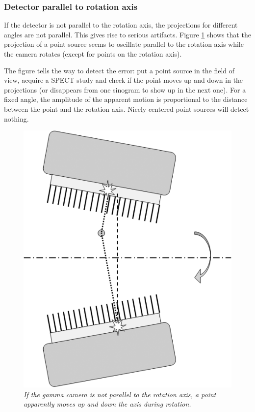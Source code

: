 \subsubsection{Detector parallel to rotation axis}
If the detector is not parallel to the rotation axis, the projections
for different angles are not parallel. This gives rise to serious
artifacts. Figure \ref{fig:gamma_parallel} shows that the projection
of a point source seems to oscillate parallel to the rotation axis
while the camera rotates (except for points on the rotation axis).

The figure tells the way to detect the error: put a point source in the field
of view, acquire a SPECT study and check if the point moves up and down in the
projections (or disappears from one sinogram to show up in the next one). For
a fixed angle, the amplitude of the apparent motion is proportional to the
distance between the point and the rotation axis. Nicely centered point
sources will detect nothing.

\begin{figure}[tb]
\centering
\includegraphics[width=0.7\figone]{figs/fig_gamma_parallel.pdf}
\caption{\label{fig:gamma_parallel} \emph{If the gamma camera is not parallel
to the rotation axis, a point apparently moves up and down the axis during
rotation.}}
\end{figure}



